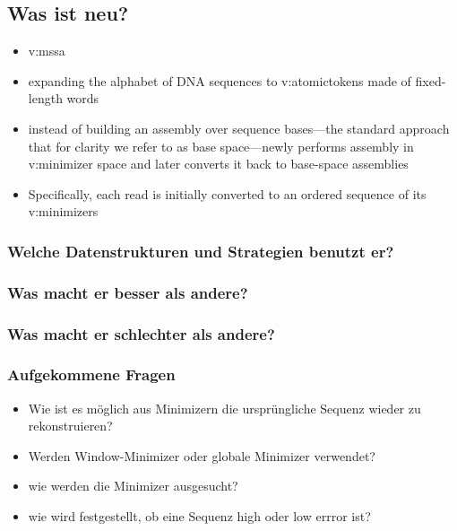 \documentclass[main.tex]{subfiles}
\begin{document}
\subsection{Was ist neu?}
\begin{itemize}
    \item \gls{v:mssa}
    \item expanding the alphabet of DNA sequences to \gls{v:atomictokens} made of fixed-length words
    \item  instead of building an assembly over sequence bases—the standard approach that for clarity we refer to as base space—newly performs assembly in \gls{v:minimizer space} and later converts it back to base-space assemblies 
    \item Specifically, each read is initially converted to an ordered sequence of its \glspl{v:minimizer}
\end{itemize}

\subsubsection{Welche Datenstrukturen und Strategien benutzt er?}
\subsubsection{Was macht er besser als andere?}
\subsubsection{Was macht er schlechter als andere?}

\subsubsection{Aufgekommene Fragen}
\begin{itemize}
    \item Wie ist es möglich aus Minimizern die ursprüngliche Sequenz wieder zu rekonstruieren? 
    \item Werden Window-Minimizer oder globale Minimizer verwendet? 
    
    \item wie werden die Minimizer ausgesucht? 
    
    \item wie wird festgestellt, ob eine Sequenz high oder low errror ist? 
\end{itemize}
 
\end{document}
